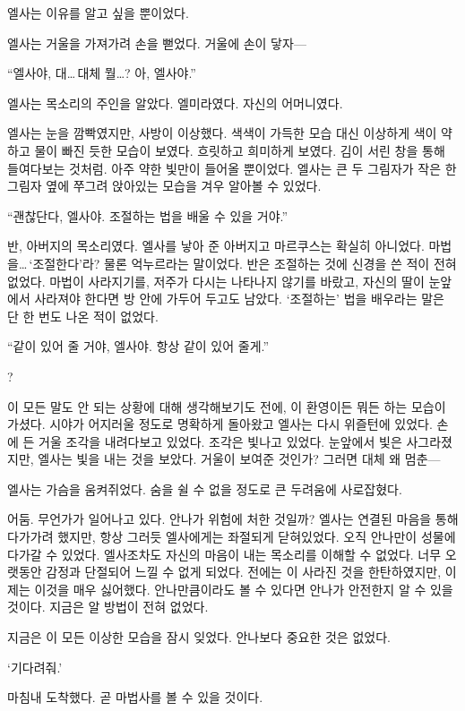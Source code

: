 엘사는 이유를 알고 싶을 뿐이었다.

엘사는 거울을 가져가려 손을 뻗었다. 거울에 손이 닿자—

``엘사야, 대\ldots\,대체 뭘\ldots? 아, 엘사야.''

엘사는 목소리의 주인을 알았다. 엘미라였다. 자신의 어머니였다.

엘사는 눈을 깜빡였지만, 사방이 이상했다. 색색이 가득한 모습 대신 이상하게 색이 약하고 물이 빠진 듯한 모습이 보였다. 흐릿하고 희미하게 보였다. 김이 서린 창을 통해 들여다보는 것처럼. 아주 약한 빛만이 들어올 뿐이었다. 엘사는 큰 두 그림자가 작은 한 그림자 옆에 쭈그려 앉아있는 모습을 겨우 알아볼 수 있었다.

``괜찮단다, 엘사야. 조절하는 법을 배울 수 있을 거야.''

반, 아버지의 목소리였다. 엘사를 낳아 준 아버지고 마르쿠스는 확실히 아니었다. 마법을\ldots\,`조절한다'라? 물론 억누르라는 말이었다. 반은 조절하는 것에 신경을 쓴 적이 전혀 없었다. 마법이 사라지기를, 저주가 다시는 나타나지 않기를 바랐고, 자신의 딸이 눈앞에서 사라져야 한다면 방 안에 가두어 두고도 남았다. `조절하는' 법을 배우라는 말은 단 한 번도 나온 적이 없었다.

``같이 있어 줄 거야, 엘사야. 항상 같이 있어 줄게.''

?

이 모든 말도 안 되는 상황에 대해 생각해보기도 전에, 이 환영이든 뭐든 하는 모습이 가셨다. 시야가 어지러울 정도로 명확하게 돌아왔고 엘사는 다시 위즐턴에 있었다. 손에 든 거울 조각을 내려다보고 있었다. 조각은 빛나고 있었다. 눈앞에서 빛은 사그라졌지만, 엘사는 빛을 내는 것을 보았다. 거울이 보여준 것인가? 그러면 대체 왜 멈춘—

엘사는 가슴을 움켜쥐었다. 숨을 쉴 수 없을 정도로 큰 두려움에 사로잡혔다.

어둠. 무언가가 일어나고 있다. 안나가 위험에 처한 것일까? 엘사는 연결된 마음을 통해 다가가려 했지만, 항상 그러듯 엘사에게는 좌절되게 닫혀있었다. 오직 안나만이 성물에 다가갈 수 있었다. 엘사조차도 자신의 마음이 내는 목소리를 이해할 수 없었다. 너무 오랫동안 감정과 단절되어 느낄 수 없게 되었다. 전에는 이 사라진 것을 한탄하였지만, 이제는 이것을 매우 싫어했다. 안나만큼이라도 볼 수 있다면 안나가 안전한지 알 수 있을 것이다. 지금은 알 방법이 전혀 없었다.

지금은 이 모든 이상한 모습을 잠시 잊었다. 안나보다 중요한 것은 없었다.

`기다려줘.'

\textbreak

마침내 도착했다. 곧 마법사를 볼 수 있을 것이다.

